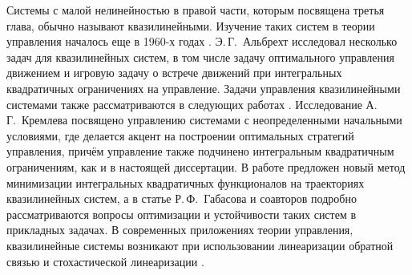 \documentclass[../abstract.tex]{subfiles}
\begin{document}
Системы с малой нелинейностью в правой части, которым посвящена третья глава, обычно называют квазилинейными. 
Изучение таких систем в теории управления началось еще в 1960-х годах \cite{Kiselev, Kras_book, Subbotin1967}.
Э.\,Г.~Альбрехт исследовал несколько задач для квазилинейных систем, в том числе задачу оптимального управления движением \cite{Albrecht1} и игровую задачу о встрече движений \cite{Albrecht2} при интегральных квадратичных ограничениях на управление.
Задачи управления квазилинейными системами также рассматриваются в следующих работах \cite{Dauer, Kremlev, KalininLavrinovich2018, Gabasov}.
Исследование А.\,Г.~Кремлева \cite{Kremlev} посвящено управлению системами с неопределенными начальными условиями, где делается акцент на построении оптимальных стратегий управления, причём управление также подчинено интегральным квадратичным ограничениям, как и в настоящей диссертации.
В работе \cite{KalininLavrinovich2018} предложен новый метод минимизации интегральных квадратичных функционалов на траекториях квазилинейных систем, а в статье Р.\,Ф.~Габасова и соавторов \cite{Gabasov} подробно рассматриваются вопросы оптимизации и устойчивости таких систем в прикладных задачах.
В современных приложениях теории управления, квазилинейные системы возникают при использовании линеаризации обратной связью и стохастической линеаризации \cite{Ching, Gui}.



\end{document}
